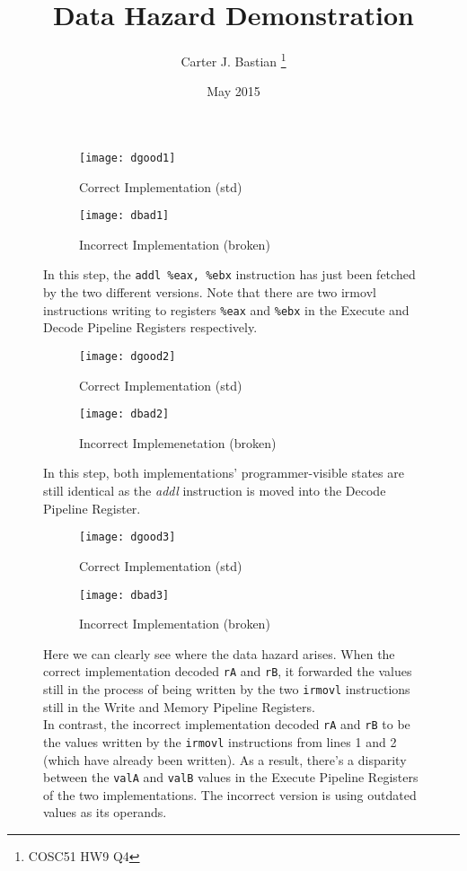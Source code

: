 \documentclass[12pt, letterpaper]{article}
\title{Data Hazard Demonstration}
\author{Carter J. Bastian \thanks{COSC51 HW9 Q4}}
\date{May 2015}
\begin{document}
\maketitle
\begin{figure}[h]
  \begin{subfigure}{0.5\textwidth}
    \texttt{[image: dgood1]}
    \caption{Correct Implementation (std)}
    \label{fig:dgood1}
    \end{subfigure}
  \begin{subfigure}{0.5\textwidth}
    \texttt{[image: dbad1]}
    \caption{Incorrect Implementation (broken)}
    \label{fig:dbad1}
  \end{subfigure}
  \caption{In this step, the \texttt{addl \%eax, \%ebx} instruction has just been
fetched by the two different versions. Note that there are two
irmovl instructions writing to registers \texttt{\%eax} and \texttt{\%ebx} in
the Execute and Decode Pipeline Registers respectively.}
  \label{fig:d1}
\end{figure}
\begin{figure}[h]
  \begin{subfigure}{0.5\textwidth}
    \texttt{[image: dgood2]}
    \caption{Correct Implementation (std)}
    \label{fig:dgood2}
    \end{subfigure}
  \begin{subfigure}{0.5\textwidth}
    \texttt{[image: dbad2]}
    \caption{Incorrect Implemenetation (broken)}
    \label{fig:dbad2}
  \end{subfigure}
  \caption{In this step, both implementations' programmer-visible states are
still identical as the \emph{addl} instruction is moved into the Decode Pipeline
Register.}
  \label{fig:d2}
\end{figure}
\begin{figure}[h]
  \begin{subfigure}{0.5\textwidth}
    \texttt{[image: dgood3]}
    \caption{Correct Implementation (std)}
    \label{fig:dgood3}
    \end{subfigure}
  \begin{subfigure}{0.5\textwidth}
    \texttt{[image: dbad3]}
    \caption{Incorrect Implementation (broken)}
    \label{fig:dbad3}
  \end{subfigure}
  \caption
{Here we can clearly see where the data hazard arises. When the correct
implementation decoded \texttt{rA} and \texttt{rB}, it forwarded the values
still in the process of being written by the two \texttt{irmovl} instructions
still in the Write and Memory Pipeline Registers. \\ In contrast, the incorrect
implementation decoded \texttt{rA} and \texttt{rB} to be the values written by
the \texttt{irmovl} instructions from lines 1 and 2 (which have already been
written). As a result, there's a disparity between the \texttt{valA} and
\texttt{valB} values in the Execute Pipeline Registers of the two
implementations. The incorrect version is using outdated values as its operands.}
  \label{fig:d3}
\end{figure}
\end{document}
